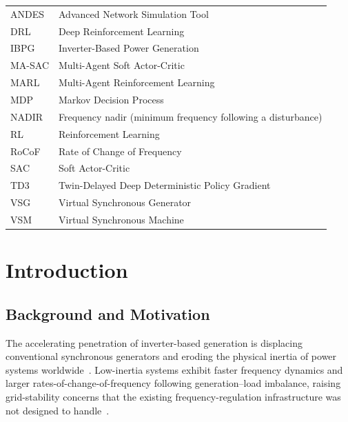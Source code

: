 \documentclass{unnc-fyp}
\begin{document}
\begin{tabular}{@{}ll@{}}
ANDES   & Advanced Network Simulation Tool \\
DRL     & Deep Reinforcement Learning \\
IBPG    & Inverter-Based Power Generation \\
MA-SAC  & Multi-Agent Soft Actor-Critic \\
MARL    & Multi-Agent Reinforcement Learning \\
MDP     & Markov Decision Process \\
NADIR   & Frequency nadir (minimum frequency following a disturbance) \\
RL      & Reinforcement Learning \\
RoCoF   & Rate of Change of Frequency \\
SAC     & Soft Actor-Critic \\
TD3     & Twin-Delayed Deep Deterministic Policy Gradient \\
VSG     & Virtual Synchronous Generator \\
VSM     & Virtual Synchronous Machine \\
\end{tabular}
\clearpage


\chapter{Introduction}
\label{ch:intro}

\section{Background and Motivation}

The accelerating penetration of inverter-based generation is
displacing conventional synchronous generators and eroding the
physical inertia of power systems worldwide~\cite{tielens2016inertia,
milano2018foundations,ipcc_ar6_2022,iea_renewables_2024}.
Low-inertia systems exhibit faster frequency dynamics and larger
rates-of-change-of-frequency following generation--load
imbalance, raising grid-stability concerns that the existing
frequency-regulation infrastructure was not designed to
handle~\cite{tielens2016inertia,markovic2021lowinertia,morren2006wind}.
\end{document}
